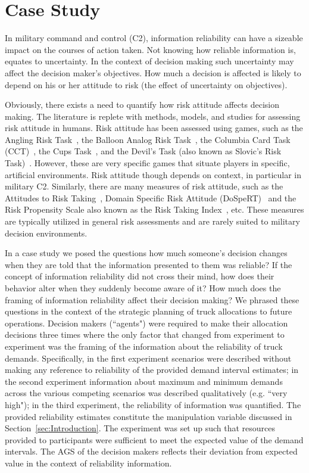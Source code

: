 \documentclass[conference]{IEEEtran}
\begin{document}
\section{Case Study}
In military command and control (C2), information reliability can have a sizeable impact on the
courses of action taken. Not knowing how reliable information is, equates to uncertainty. In the
context of decision making such uncertainty may affect the decision maker's objectives. How much a
decision is affected is likely to depend on his or her attitude to risk (the effect of uncertainty
on objectives).

Obviously, there exists a need to quantify how risk attitude affects decision making. The
literature is replete with methods, models, and studies for assessing risk attitude in humans. Risk
attitude has been assessed using games, such as the Angling Risk Task~\cite{art}, the Balloon
Analog Risk Task~\cite{bart}, the Columbia Card Task (CCT)~\cite{cct}, the Cups Task~\cite{cups},
and the Devil's Task (also known as Slovic's Risk Task)~\cite{devil}. However, these are very
specific games that situate players in specific, artificial environments. Risk attitude though
depends on context, in particular in military C2. Similarly, there are many measures of risk
attitude, such as the Attitudes to Risk Taking~\cite{art2}, Domain Specific Risk Attitude
(DoSpeRT)~\cite{dospert} and the Risk Propensity Scale also known as the Risk Taking
Index~\cite{rti}, etc. These measures are typically utilized in general risk assessments and are
rarely suited to military decision environments.

In a case study we posed the questions how much someone's decision changes when they are told that
the information presented to them was reliable? If the concept of information reliability did not
cross their mind, how does their behavior alter when they suddenly become aware of it? How much
does the framing of information reliability affect their decision making? We phrased these
questions in the context of the strategic planning of truck allocations to future operations.
Decision makers (``agents") were required to make their allocation decisions three times where the
only factor that changed from experiment to experiment was the framing of the information about the
reliability of truck demands. Specifically, in the first experiment scenarios were described
without making any reference to reliability of the provided demand interval estimates; in the
second experiment information about maximum and minimum demands across the various competing
scenarios was described qualitatively (e.g. ``very high"); in the third experiment, the reliability
of information was quantified. The provided reliability estimates constitute the manipulation
variable discussed in Section~\ref{sec:Introduction}. The experiment was set up such that resources
provided to participants were sufficient to meet the expected value of the demand intervals. The
AGS of the decision makers reflects their deviation from expected value in the context of
reliability information.
\end{document}
